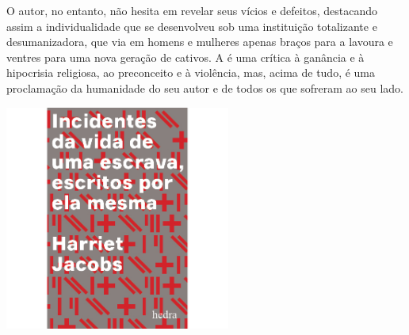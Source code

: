 O autor, no entanto, não hesita em revelar seus vícios e defeitos, destacando assim a individualidade que se desenvolveu sob uma instituição totalizante e desumanizadora, que via em homens e mulheres apenas braços para a lavoura e ventres para uma nova geração de cativos. A {} é uma crítica à ganância e à hipocrisia religiosa, ao preconceito e à violência, mas, acima de tudo, é uma proclamação da humanidade do seu autor e de todos os que sofreram ao seu lado.

\vfill

\hspace*{-.4cm}\begin{minipage}[c]{1\linewidth}
\small{
{}}
\end{minipage}

\pagebreak

\begin{center}
\hspace*{.5cm}\includegraphics[width=74mm]{./grid/jacobs.jpg}
\end{center}

\hspace*{-7cm}\hrulefill\hspace*{-7cm}

\medskip

